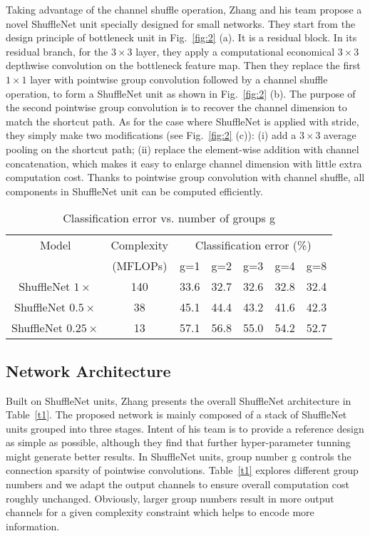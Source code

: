 \documentclass[10pt,twocolumn,letterpaper]{article}
\begin{document}
Taking advantage of the channel shuffle operation, Zhang and his team propose a novel ShuffleNet unit specially designed for small networks. They start from the design principle of bottleneck unit \cite{he2016deep} in Fig.~\ref{fig:2} (a). It is a residual block. In its residual branch, for the $3\times 3$ layer, they apply a computational economical $3\times 3$ depthwise convolution \cite{chollet2016xception} on the bottleneck feature map. Then they replace the first $1\times 1$ layer with pointwise group convolution followed by a channel shuffle operation, to form a ShuffleNet unit as shown in Fig.~\ref{fig:2} (b). The purpose of the second pointwise group convolution is to recover the channel dimension to match the shortcut path. As for the case where ShuffleNet is applied with stride, they simply make two modifications (see Fig.~\ref{fig:2} (c)): (i) add a $3\times 3$ average pooling on the shortcut path; (ii) replace the element-wise addition with channel concatenation, which makes it easy to enlarge channel dimension with little extra computation cost. Thanks to pointwise group convolution with channel shuffle, all components in ShuffleNet unit can be computed efficiently.

\begin{table*}
\caption{Classification error vs. number of groups g}\label{t2}
	\begin{center}
		\begin{tabular}{c|c|c c c c c }
			\hline
			Model & Complexity & \multicolumn{5}{c}{Classification error (\%)} \\
			&(MFLOPs) & g=1 & g=2 & g=3 & g=4 & g=8 \\
			\hline\hline
			ShuffleNet $1\times$& 140 & 33.6 & 32.7& 32.6& 32.8 &32.4 \\
			ShuffleNet $0.5\times$& 38 & 45.1 & 44.4& 43.2&41.6 &42.3 \\
			ShuffleNet $0.25\times$& 13 & 57.1 & 56.8&55.0 &54.2 &52.7 \\
			\hline
		\end{tabular}
	\end{center}
\end{table*}

\subsection{Network Architecture}

Built on ShuffleNet units, Zhang presents the overall ShuffleNet architecture in Table~\ref{t1}. The proposed network is mainly composed of a stack of ShuffleNet units grouped into three stages. Intent of his team is to provide a reference design as simple as possible, although they find that further hyper-parameter tunning might generate better results. In ShuffleNet units, group number g controls the connection sparsity of pointwise convolutions. Table~\ref{t1} explores different group numbers and we adapt the output channels to ensure overall computation cost roughly unchanged. Obviously, larger group numbers result in more output channels for a given complexity constraint which helps to encode more information.
\end{document}
